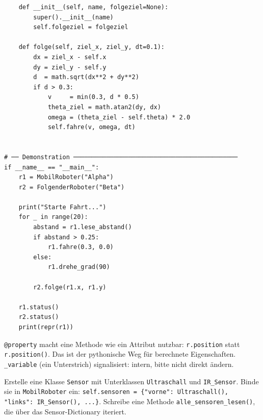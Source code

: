 \begin{lstlisting}
    def __init__(self, name, folgeziel=None):
        super().__init__(name)
        self.folgeziel = folgeziel

    def folge(self, ziel_x, ziel_y, dt=0.1):
        dx = ziel_x - self.x
        dy = ziel_y - self.y
        d  = math.sqrt(dx**2 + dy**2)
        if d > 0.3:
            v     = min(0.3, d * 0.5)
            theta_ziel = math.atan2(dy, dx)
            omega = (theta_ziel - self.theta) * 2.0
            self.fahre(v, omega, dt)


# ── Demonstration ─────────────────────────────────────────────
if __name__ == "__main__":
    r1 = MobilRoboter("Alpha")
    r2 = FolgenderRoboter("Beta")

    print("Starte Fahrt...")
    for _ in range(20):
        abstand = r1.lese_abstand()
        if abstand > 0.25:
            r1.fahre(0.3, 0.0)
        else:
            r1.drehe_grad(90)

        r2.folge(r1.x, r1.y)

    r1.status()
    r2.status()
    print(repr(r1))
\end{lstlisting}

\begin{merksatz}
\texttt{@property} macht eine Methode wie ein Attribut nutzbar: \texttt{r.position} statt \texttt{r.position()}. Das ist der pythonische Weg für berechnete Eigenschaften. \texttt{\_variable} (ein Unterstrich) signalisiert: intern, bitte nicht direkt ändern.
\end{merksatz}

\begin{uebung}[title=Projektaufgabe Modul 9: Roboterflotte]
Erstelle eine Klasse \texttt{Sensor} mit Unterklassen \texttt{Ultraschall} und \texttt{IR\_Sensor}. Binde sie in \texttt{MobilRoboter} ein: \texttt{self.sensoren = \{"vorne": Ultraschall(), "links": IR\_Sensor(), ...\}}. Schreibe eine Methode \texttt{alle\_sensoren\_lesen()}, die über das Sensor-Dictionary iteriert.
\end{uebung}
